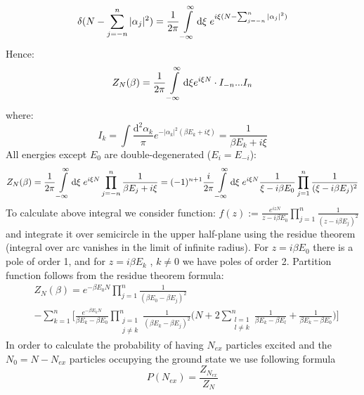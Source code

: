 \documentclass{article}
\begin{document}
\begin{equation*}
\delta (N-\sum_{j=-n}^n |\alpha_j|^2)=\frac{1}{2 \pi} \int\displaylimits_{-\infty}^{\infty} \mathrm{d} \xi \; e^{i \xi (N-\sum_{j=-n}^n |\alpha_j|^2)}
\end{equation*}
Hence:
\begin{equation*}
    Z_N(\beta)=\frac{1}{2\pi}\int\displaylimits_{-\infty}^{\infty} \mathrm{d} \xi e^{i \xi N} \cdot {\Large I_{-n} . . . I_n}
\end{equation*}
where:
\begin{equation*}
    I_k=\int \frac{\mathrm{d}^2 \alpha_{k}}{\pi}e^{-|\alpha_k|^2(\beta E_k+i \xi)}=\frac{1}{\beta E_k+ i \xi}
\end{equation*}
All energies except $E_0$ are double-degenerated ($E_i=E_{-i}$):
\begin{equation*}
    Z_N(\beta)=\frac{1}{2 \pi} \int\displaylimits_{-\infty}^{\infty} \mathrm{d} \xi \; e^{i \xi N} \prod _{j=-n}^{n} \frac{1}{\beta E_j+i \xi}=(-1)^{n+1}\frac{i}{2\pi}\int\displaylimits_{-\infty}^{\infty} \mathrm{d} \xi \; e^{i \xi N} \frac{1}{\xi- i\beta E_0} \prod_{j=1}^n\frac{1}{(\xi - i \beta E_j)^2}
\end{equation*}
To calculate above integral we consider function: $f(z):=\frac{e^{izN}}{z-i\beta E_0}\prod_{j=1}^n\frac{1}{(z-i\beta E_j)^2}$ and integrate it over semicircle in the upper half-plane using the residue theorem (integral over arc vanishes in the limit of infinite radius). For $z=i \beta E_0$ there is a pole of order 1, and for $z=i \beta E_k$ , $k \neq 0$ we have poles of order 2.
Partition function follows from the residue theorem formula:
\begin{equation*}
\begin{aligned}
   & Z_N(\beta)=e^{-\beta E_0 N} \prod_{j=1}^n \frac{1}{(\beta E_0 -\beta E_j)^2}\\&-\sum_{k=1}^n \Bigg[ \frac{e^{-\beta E_k N}}{\beta E_k- \beta E_0} \prod_{\substack{j=1\\j \neq k}}^n \frac{1}{(\beta E_k -\beta E_j)^2}\Bigg(N+2\sum_{\substack{l=1\\l \neq k}}^n \frac{1}{\beta E_k-\beta E_l}+ \frac{1}{\beta E_k -\beta E_0}\Bigg) \Bigg]
  \end{aligned}  
\end{equation*}
In order to calculate the probability of having $N_{ex}$ particles excited and the $N_0=N-N_{ex}$ particles occupying the ground state we use following formula ~\cite{weiss1997particle}
\begin{equation}
\label{eq:pnex}
    P(N_{ex})=\frac{Z_{N_{ex}}}{Z_N}
\end{equation}
\end{document}

